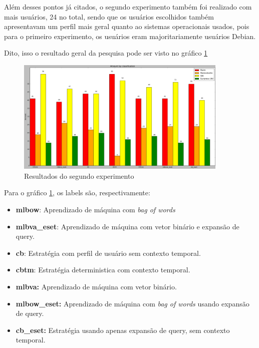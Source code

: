 Além desses pontos já citados, o segundo experimento também foi realizado com
mais usuários, 24 no total, sendo que os usuários escolhidos também apresentavam
um perfil mais geral quanto ao sistemas operacionais usados, pois para o
primeiro experimento, os usuários eram majoritariamente usuários Debian.

Dito, isso o resultado geral da pesquisa pode ser visto no gráfico
\ref{fig:segundo_experimento}

\begin{figure}[h]
  \centering
  \includegraphics[width=0.9\textwidth]{figuras/segundo_experimento.eps}
  \caption{Resultados do segundo experimento}
  \label{fig:segundo_experimento}
\end{figure}

Para o gráfico \ref{fig:segundo_experimento}, os labels são, respectivamente:

\begin{itemize}
    \item \textbf{mlbow}: Aprendizado de máquina com \textit{bag of words}
    \item \textbf{mlbva\_eset}: Aprendizado de máquina com vetor binário e
    expansão de query.
    \item \textbf{cb}: Estratégia com perfil de usuário sem contexto temporal.
    \item \textbf{cbtm}: Estratégia deterministica com contexto temporal.
    \item \textbf{mlbva:} Aprendizado de máquina com vetor binário.
    \item \textbf{mlbow\_eset:} Aprendizado de máquina com \textit{bag of words}
        usando expansão de query.
    \item \textbf{cb\_eset:} Estratégia usando apenas expansão de query, sem
        contexto temporal.
\end{itemize}

